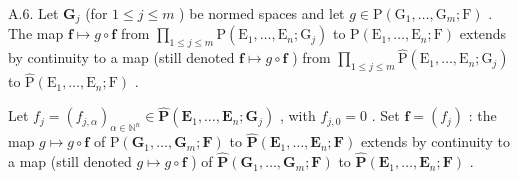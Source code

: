 A.6. Let \(\mathbf{G}_j\) (for \(1 \leqslant j \leqslant m\) ) be normed spaces and let \(g \in \mathrm{P}(\mathrm{G}_1, \ldots, \mathrm{G}_m; \mathrm{F})\) . The map \(\mathbf{f} \mapsto g \circ \mathbf{f}\) from \(\prod_{1 \leqslant j \leqslant m} \mathrm{P}(\mathrm{E}_1, \ldots, \mathrm{E}_n; \mathrm{G}_j)\) to \(\mathrm{P}(\mathrm{E}_1, \ldots, \mathrm{E}_n; \mathrm{F})\) extends by continuity to a map (still denoted \(\mathbf{f} \mapsto g \circ \mathbf{f}\) ) from \(\prod_{1 \leqslant j \leqslant m} \hat{\mathrm{P}}(\mathrm{E}_1, \ldots, \mathrm{E}_n; \mathrm{G}_j)\) to \(\hat{\mathrm{P}}(\mathrm{E}_1, \ldots, \mathrm{E}_n; \mathrm{F})\) .

Let \(f_j = (f_{j,\alpha})_{\alpha \in \mathbb{N}^n} \in \hat{\mathbf{P}}(\mathbf{E}_1, \ldots, \mathbf{E}_n; \mathbf{G}_j)\) , with \(f_{j,0} = 0\) . Set \(\mathbf{f} = (f_j)\) : the map \(g \mapsto g \circ \mathbf{f}\) of \(\mathrm{P}(\mathbf{G}_1, \ldots, \mathbf{G}_m; \mathbf{F})\) to \(\hat{\mathbf{P}}(\mathbf{E}_1, \ldots, \mathbf{E}_n; \mathbf{F})\) extends by continuity to a map (still denoted \(g \mapsto g \circ \mathbf{f}\) ) of \(\hat{\mathbf{P}}(\mathbf{G}_1, \ldots, \mathbf{G}_m; \mathbf{F})\) to \(\hat{\mathbf{P}}(\mathbf{E}_1, \ldots, \mathbf{E}_n; \mathbf{F})\) .

